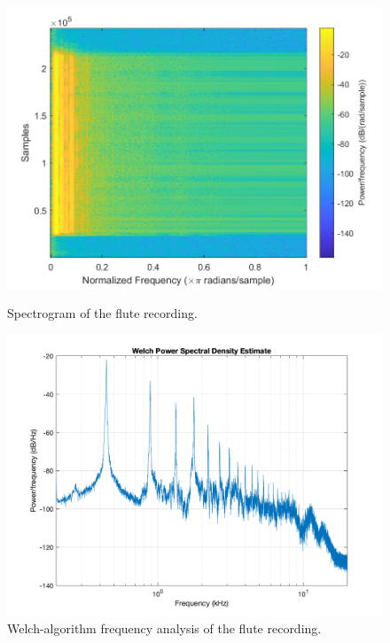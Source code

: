 \documentclass{article}
\begin{document}
            \begin{figure}[H]
                \centering
                \begin{minipage}{.49\textwidth}
                    \includegraphics[width=\linewidth]{images/fluteSpec.png}%
                    \centering
                    \caption{Spectrogram of the flute recording.}
                    \label{fluteSpec}
                \end{minipage}
                \begin{minipage}{.49\textwidth}
                    \includegraphics[width=\linewidth]{images/fluteWelch.png}%
                    \centering
                    \caption{Welch-algorithm frequency analysis of the flute recording.}
                    \label{fluteWelch}
                \end{minipage}

            \end{figure}
\end{document}
